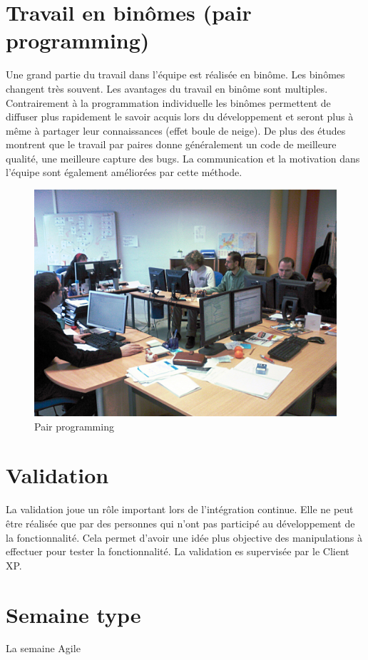 \section{Travail en binômes (pair programming)}
Une grand partie du travail dans l'équipe est réalisée en binôme. Les binômes changent très souvent. Les avantages du travail en binôme sont multiples. Contrairement à la programmation individuelle les binômes permettent de diffuser plus rapidement le savoir acquis lors du développement et seront plus à même à partager leur connaissances (effet boule de neige). De plus des études montrent que le travail par paires donne généralement un code de meilleure qualité, une meilleure capture des bugs. La communication et la motivation dans l'équipe sont également améliorées par cette méthode.
\begin{figure}[!h]
\centering
\includegraphics[scale=0.15]{Illustrations/SP_A0188.jpg}
\caption{Pair programming}
\label{fig:Pair programming}
\end{figure}
\section{Validation}
La validation joue un rôle important lors de l'intégration continue. Elle ne peut être réalisée que par des personnes qui n'ont pas participé au développement de la fonctionnalité. Cela permet d'avoir une idée plus objective des manipulations à effectuer pour tester la fonctionnalité. La validation es supervisée par le Client XP.


\section{Semaine type}
La semaine Agile 
